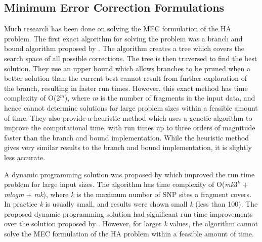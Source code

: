 \documentclass[10pt,twocolumn]{article}
\newcommand{\K}{\textit{k }}
\newcommand{\M}{\textit{m }}
\begin{document}
\subsection{Minimum Error Correction Formulations} \label{sec:mecimp}

Much research has been done on solving the MEC formulation of the HA problem. The first exact algorithm for
solving the problem was a branch and bound algorithm proposed by \cite{wang:2005}. The algorithm creates a
tree which covers the search space of all possible corrections. The tree is then traversed to find the best
solution. They use an upper bound which allows branches to be pruned when a better solution than the current 
best cannot result from further exploration of the branch, resulting in faster run times. However, this exact 
method has time complexity of O(2$^{\textit{m}}$), where \M is the number of fragments in the input data, and 
hence cannot determine solutions for large problem sizes within a feasible amount of time. They also 
provide a heuristic method which uses a genetic algorithm to improve the computational time, with
run times up to three orders of magnitude faster than the branch and bound implementation. While the heuristic
method gives very similar results to the branch and bound implementation, it is slightly less accurate. 

A dynamic programming solution was proposed by \cite{xie:2008} which improved the run time problem for large
input sizes. The algorithm has time complexity of O(\textit{mk}3$^{\textit{k}}$ + \textit{mlogm} +
\textit{mk}), where \K is the maximum number of SNP sites a fragment covers. In practice \K is usually small,
and results were shown small \K (less than 100). The proposed dynamic programming solution had significant run
time improvements over the solution proposed by \cite{wang:2005}. However, for larger \K values, the 
algorithm cannot solve the MEC formulation of the HA problem within a feasible amount of time. 
\end{document}
